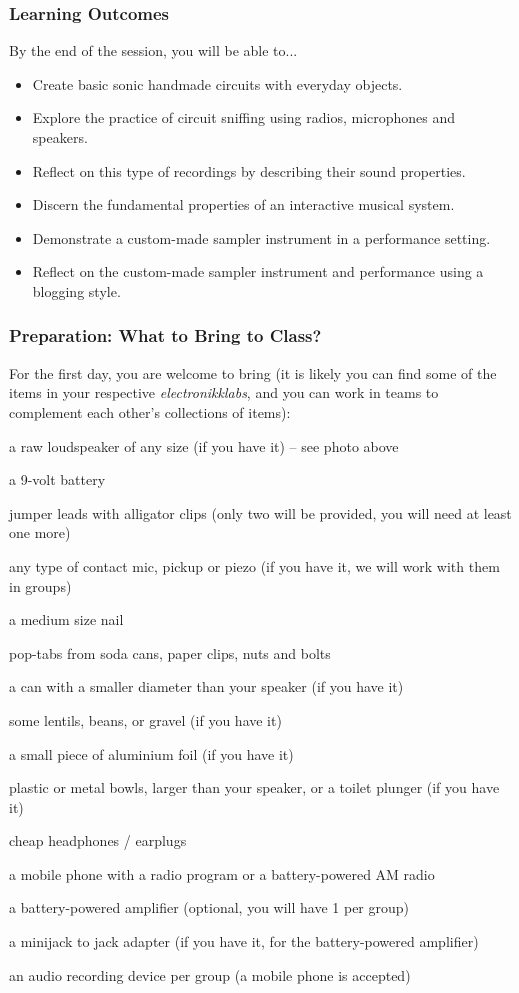 \documentclass[screen, aspectratio=43]{beamer}
\begin{document}
\begin{frame}
\frametitle{Learning Outcomes}
By the end of the session,  you will be able to...
\begin{itemize}
\item Create basic sonic handmade circuits with everyday objects.
\item Explore the practice of circuit sniffing using radios, microphones and speakers.
\item Reflect on this type of recordings by describing their sound properties.
\item Discern the fundamental properties of an interactive musical system.
\item Demonstrate a custom-made sampler instrument in a performance setting.
\item Reflect on the custom-made sampler instrument and performance using a blogging style.
\end{itemize}
\end{frame}
%
\begin{frame}
  \frametitle{Preparation: What to Bring to Class?}
  For the first day, you are welcome to bring (it is likely you can find some of the items in your respective \emph{electronikklabs}, and you can work in teams to complement each other's collections of items):
        \begin{itemize}
	{\tiny 	
	\item a raw loudspeaker of any size (if you have it) -- see photo above
	\item a 9-volt battery
	\item jumper leads with alligator clips (only two will be provided, you will need at least one more)
	\item any type of contact mic, pickup or piezo (if you have it, we will work with them in groups)
	\item a medium size nail
	\item pop-tabs from soda cans, paper clips, nuts and bolts
	\item a can with a smaller diameter than your speaker (if you have it)
	\item some lentils, beans, or gravel (if you have it)
	\item a small piece of aluminium foil (if you have it)
	\item plastic or metal bowls, larger than your speaker, or a toilet plunger (if you have it)
	\item cheap headphones / earplugs
	\item a mobile phone with a radio program or a battery-powered AM radio
	\item a battery-powered amplifier (optional, you will have 1 per group)
	\item a minijack to jack adapter (if you have it, for the battery-powered amplifier)
	\item an audio recording device per group (a mobile phone is accepted)
	}
         \end{itemize}
\end{frame}
%
\end{document}
